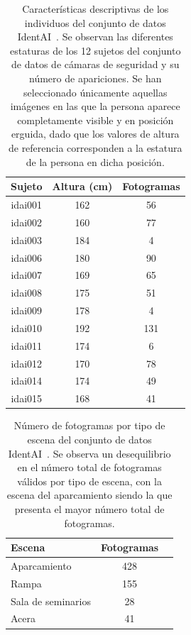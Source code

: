 \begin{table}[!htp]
  \scriptsize
  \centering
\begin{tabular}{|c|c|c|}
\hline
\rowcolor[HTML]{FFCB2F}
\textbf{Sujeto} & \textbf{Altura (cm)} & \textbf{Fotogramas} \\
\hline
idai001 & 162 & 56 \\
\hline
idai002 & 160 & 77 \\
\hline
idai003 & 184 & 4 \\
\hline
idai006 & 180 & 90 \\
\hline
idai007 & 169 & 65 \\
\hline
idai008 & 175 & 51 \\
\hline
idai009 & 178 & 4 \\
\hline
idai010 & 192 & 131 \\
\hline
idai011 & 174 & 6 \\
\hline
idai012 & 170 & 78 \\
\hline
idai014 & 174 & 49 \\
\hline
idai015 & 168 & 41 \\
\hline
\end{tabular}
\caption[Características descriptivas de los individuos del conjunto de datos IdentAI~\cite{panacea2026}.]{
  Características descriptivas de los individuos del conjunto de datos IdentAI~\cite{panacea2026}.
  Se observan las diferentes estaturas de los 12 sujetos del conjunto de datos de cámaras de seguridad y su número de apariciones.
  Se han seleccionado únicamente aquellas imágenes en las que la persona aparece completamente visible y en posición erguida,
  dado que los valores de altura de referencia corresponden a la estatura de la persona en dicha posición.
}
\label{tab:SubjectHeights}
\end{table}

\begin{table}[!htp]
  \scriptsize
  \centering
\begin{tabular}{|l|c|c|}
\hline
\rowcolor[HTML]{FFCB2F}
\textbf{Escena} & \textbf{Fotogramas} \\
\hline
Aparcamiento & 428 \\
\hline
Rampa & 155 \\
\hline
Sala de seminarios & 28 \\
\hline
Acera & 41 \\
\hline
\end{tabular}
\caption[Número de fotogramas por tipo de escena del conjunto de datos IdentAI~\cite{panacea2026}.]
{
  Número de fotogramas por tipo de escena del conjunto de datos IdentAI~\cite{panacea2026}.
  Se observa un desequilibrio en el número total de fotogramas válidos por tipo de escena,
  con la escena del aparcamiento siendo la que presenta el mayor número total de fotogramas.
}\label{tab:TypeOfScenes}
\end{table}

